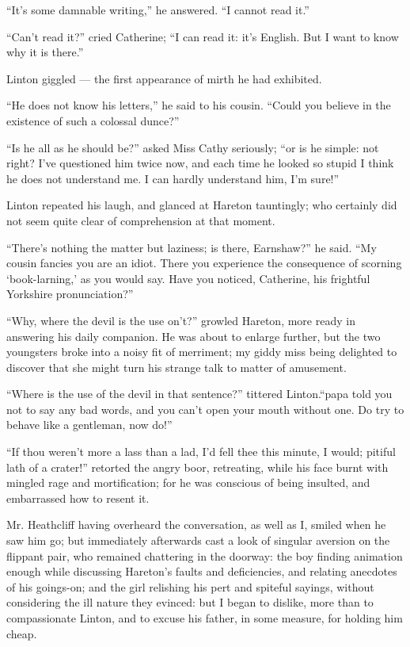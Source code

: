 \par “It's some damnable writing,” he answered. “I cannot read it.”
\par “Can't read it?” cried Catherine; “I can read it: it's English. But I want to know why it is there.”
\par Linton giggled — the first appearance of mirth he had exhibited.
\par “He does not know his letters,” he said to his cousin. “Could you believe in the existence of such a colossal dunce?”
\par “Is he all as he should be?” asked Miss Cathy seriously; “or is he simple: not right? I've questioned him twice now, and each time he looked so stupid I think he does not understand me. I can hardly understand him, I'm sure!”
\par Linton repeated his laugh, and glanced at Hareton tauntingly; who certainly did not seem quite clear of comprehension at that moment.
\par “There's nothing the matter but laziness; is there, Earnshaw?” he said. “My cousin fancies you are an idiot. There you experience the consequence of scorning ‘book-larning,’ as you would say. Have you noticed, Catherine, his frightful Yorkshire pronunciation?”
\par “Why, where the devil is the use on't?” growled Hareton, more ready in answering his daily companion. He was about to enlarge further, but the two youngsters broke into a noisy fit of merriment; my giddy miss being delighted to discover that she might turn his strange talk to matter of amusement.
\par “Where is the use of the devil in that sentence?” tittered Linton.“papa told you not to say any bad words, and you can't open your mouth without one. Do try to behave like a gentleman, now do!”
\par “If thou weren't more a lass than a lad, I'd fell thee this minute, I would; pitiful lath of a crater!” retorted the angry boor, retreating, while his face burnt with mingled rage and mortification; for he was conscious of being insulted, and embarrassed how to resent it.
\par Mr. Heathcliff having overheard the conversation, as well as I, smiled when he saw him go; but immediately afterwards cast a look of singular aversion on the flippant pair, who remained chattering in the doorway: the boy finding animation enough while discussing Hareton's faults and deficiencies, and relating anecdotes of his goings-on; and the girl relishing his pert and spiteful sayings, without considering the ill nature they evinced: but I began to dislike, more than to compassionate Linton, and to excuse his father, in some measure, for holding him cheap.
